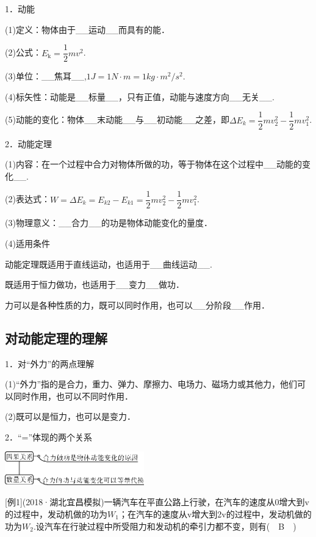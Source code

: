 1．动能

(1)定义：物体由于\_\_运动\_\_而具有的能．

(2)公式：$E_{\mathrm{k}}=\dfrac{1}{2} m v^{2}$.

(3)单位：\_\_焦耳\_\_,$1 J=1 N\cdot m=1 kg\cdot m^2/s^2$.

(4)标矢性：动能是\_\_标量\_\_，只有正值，动能与速度方向\_\_无关\_\_.

(5)动能的变化：物体\_\_末动能\_\_与\_\_初动能\_\_之差，即$\Delta E_k=\dfrac{1}{2}mv_2^{2}-\dfrac{1}{2}mv_1^{2}$.

2．动能定理

(1)内容：在一个过程中合力对物体所做的功，等于物体在这个过程中\_\_动能的变化\_\_.

(2)表达式：$W=\Delta E_k=E_{k2}-E_{k1}=\dfrac{1}{2}mv_2^{2}-\dfrac{1}{2}mv_1^{2}$.

(3)物理意义：\_\_合力\_\_的功是物体动能变化的量度．

(4)适用条件

动能定理既适用于直线运动，也适用于\_\_曲线运动\_\_.

既适用于恒力做功，也适用于\_\_变力\_\_做功．

力可以是各种性质的力，既可以同时作用，也可以\_\_分阶段\_\_作用．

\newpage
\subsection{对动能定理的理解}

1．对``外力''的两点理解

(1)``外力''指的是合力，重力、弹力、摩擦力、电场力、磁场力或其他力，他们可以同时作用，也可以不同时作用．

(2)既可以是恒力，也可以是变力．

2．``=''体现的两个关系

\begin{center}\includegraphics[width=2.37708in,height=0.56597in]{media/image223.png}\end{center}

{[}例1{]}(2018·湖北宜昌模拟)一辆汽车在平直公路上行驶，在汽车的速度从0增大到v的过程中，发动机做的功为$W_1$；在汽车的速度从v增大到2v的过程中，发动机做的功为$W_2$.设汽车在行驶过程中所受阻力和发动机的牵引力都不变，则有(　B　)

